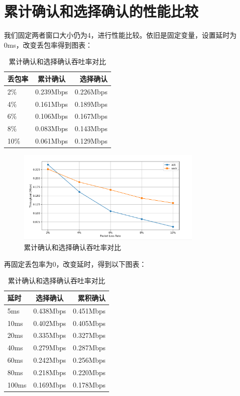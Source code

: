 \documentclass[UTF8,a4paper,10pt]{ctexart}
\begin{document}
\section{累计确认和选择确认的性能比较}
我们固定两者窗口大小仍为4，进行性能比较。依旧是固定变量，设置延时为0ms，改变丢包率得到图表：
\begin{table}[h!]
  \centering
  \begin{tabular}{|l|c|r|} %
    \hline
    丢包率 & 累计确认    & 选择确认 \\ \hline
    2\% & 0.239Mbps & 0.226Mbps \\ \hline
    4\% & 0.161Mbps & 0.189Mbps \\ \hline
    6\% & 0.106Mbps & 0.167Mbps \\ \hline
    8\% & 0.083Mbps & 0.143Mbps \\ \hline
    10\% & 0.061Mbps & 0.129Mbps \\ \hline
  \end{tabular}
  \caption{累计确认和选择确认吞吐率对比}
  \label{tab:my_label}
\end{table}\par
\begin{figure}[H]
    \centering
\includegraphics[width=0.8\textwidth]{img/p3-1.png}
    \caption{累计确认和选择确认吞吐率对比}
\end{figure}
再固定丢包率为0，改变延时，得到以下图表：
\begin{table}[h!]
  \centering
  \begin{tabular}{|l|c|r|} %
    \hline
  延时    & 选择确认    & 累积确认      \\ \hline
  5ms	   & 0.438Mbps	& 0.451Mbps    \\ \hline
 10ms	& 0.402Mbps  & 0.405Mbps    \\ \hline
 20ms	& 0.335Mbps  & 0.327Mbps    \\ \hline  
 40ms	& 0.279Mbps	 & 0.287Mbps    \\ \hline
 60ms	& 0.242Mbps	 & 0.256Mbps    \\ \hline
 80ms	& 0.218Mbps  & 0.220Mbps    \\ \hline
100ms	 & 0.169Mbps  & 0.178Mbps    \\ \hline
  \end{tabular}
  \caption{累计确认和选择确认吞吐率对比}
  \label{tab:my_label}
\end{table}\par
\end{document}

